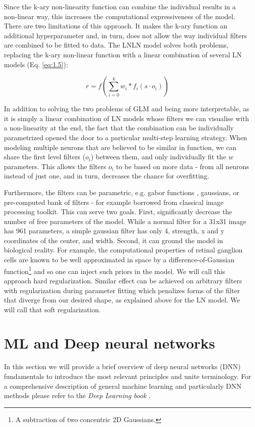 Since the k-ary non-linearity function can combine the individual results in a non-linear way, this increases the computational expressiveness of the model. There are two limitations of this approach. It makes the k-ary function an additional hyperparameter and, in turn, does not allow the way individual filters are combined to be fitted to data. The LNLN model solves both problems, replacing the k-ary non-linear function with a linear combination of several LN models (Eq. \ref{eq:1.5}):

\begin{equation}\label{eq:1.5}
    r = f(\sum_{i=0}^{k} w_i * f_i(s \cdot o_i))
\end{equation}

In addition to solving the two problems of GLM and being more interpretable, as it is simply a linear combination of LN models whose filters we can visualise with a non-linearity at the end, the fact that the combination can be individually parametrized opened the door to a particular multi-step learning strategy. When modeling multiple neurons that are believed to be similar in function, we can share the first level filters ($o_i$) between them, and only individually fit the $w$ parameters. This allows the filters $o_i$ to be based on more data - from all neurons instead of just one, and in turn, decreases the chance for overfitting.

\label{intr:hard-reg}\label{intr:soft-reg}Furthermore, the filters can be parametric, e.g. gabor functions \citep{Kay2008}, gaussians, or pre-computed bank of filters - for example borrowed from classical image processing toolkit. This can serve two goals. First, significantly decrease the number of free parameters of the model. While a normal filter for a 31x31 image has 961 parameters, a simple gaussian filter has only 4, strength, x and y coordinates of the center, and width. Second, it can ground the model in biological reality. For example, the computational properties of retinal ganglion cells are known to be well approximated in space by a difference-of-Gaussian function\footnote{A subtraction of two concentric 2D Gaussians.} and so one can inject such priors in the model. We will call this approach hard regularization. Similar effect can be achieved on arbitrary filters with regularization during parameter fitting which penalizes forms of the filter that diverge from our desired shape, as explained above for the LN model. We will call that soft regularization.

\section{ML and Deep neural networks}
In this section we will provide a brief overview of deep neural networks (DNN) fundamentals to introduce the most relevant principles and unite terminology. For a comprehensive description of general machine learning and particularly DNN methods please refer to the \textit{Deep Learning book} \citep{Goodfellow-et-al-2016}.

